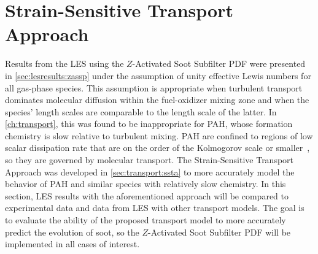 \section{Strain-Sensitive Transport Approach}
\label{sec:lesresults:ssta}



Results from the LES using the $Z$-Activated Soot Subfilter PDF were presented in \cref{sec:lesresults:zassp} under the assumption of unity effective Lewis numbers for all gas-phase species. This assumption is appropriate when turbulent transport dominates molecular diffusion within the fuel-oxidizer mixing zone and when the species' length scales are comparable to the length scale of the latter. In \cref{ch:transport}, this was found to be inappropriate for PAH, whose formation chemistry is slow relative to turbulent mixing. PAH are confined to regions of low scalar dissipation rate that are on the order of the Kolmogorov scale or smaller~\cite{vaishnavi2008}, so they are governed by molecular transport. The Strain-Sensitive Transport Approach was developed in \cref{sec:transport:ssta} to more accurately model the behavior of PAH and similar species with relatively slow chemistry. In this section, LES results with the aforementioned approach will be compared to experimental data and data from LES with other transport models. The goal is to evaluate the ability of the proposed transport model to more accurately predict the evolution of soot, so the $Z$-Activated Soot Subfilter PDF will be implemented in all cases of interest.

